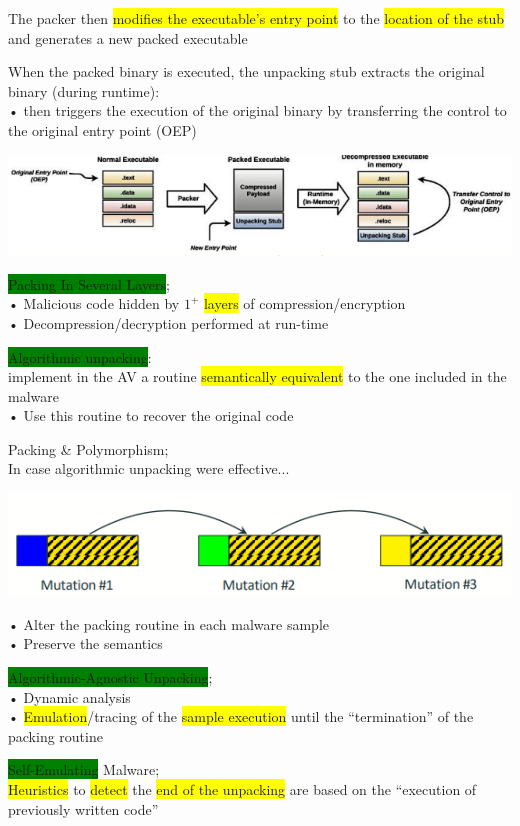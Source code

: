 \documentclass[]{project_plan}
\begin{document}
The packer then \colorbox{yellow}{modifies the executable’s entry point} to the \colorbox{yellow}{location of the stub} and generates
a new packed executable

When the packed binary is executed, the unpacking stub extracts the original binary (during
runtime):\\
• then triggers the execution of the original binary by transferring the control to the original entry point (OEP)

\includegraphics[width=\linewidth]{packers.png}

\colorbox{green}{Packing In Several Layers};\\
• Malicious code hidden by $1^+$ \colorbox{yellow}{layers} of compression/encryption\\
• Decompression/decryption performed at run-time

\colorbox{green}{Algorithmic unpacking}:\\
implement in the AV a routine \colorbox{yellow}{semantically equivalent} to the one included
in the malware\\
• Use this routine to recover the original code

Packing \& Polymorphism;\\
In case algorithmic unpacking were effective...

\includegraphics[width=.8\linewidth]{packing polymorphism.png}

• Alter the packing routine in each malware sample\\
• Preserve the semantics

\colorbox{green}{Algorithmic-Agnostic Unpacking};\\
• Dynamic analysis\\
• \colorbox{yellow}{Emulation}/tracing of the \colorbox{yellow}{sample execution} until the “termination” of the packing
routine

\colorbox{green}{Self-Emulating} Malware;\\
\colorbox{yellow}{Heuristics} to \colorbox{yellow}{detect} the \colorbox{yellow}{end of the unpacking} are based on the “execution of
previously written code”
\end{document}
